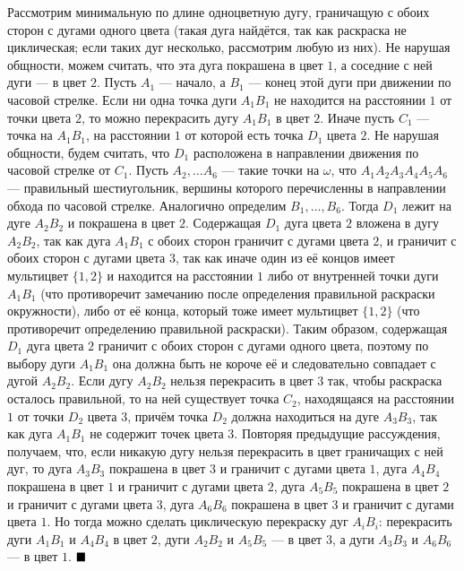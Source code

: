 \documentclass[12pt,a4paper]{article}
\renewcommand{\qed}{$\blacksquare \vspace{5mm}$}
\begin{document}
	Рассмотрим минимальную по длине одноцветную дугу, граничащую с обоих сторон с дугами одного цвета (такая дуга найдётся, так как раскраска не циклическая; если таких дуг несколько, рассмотрим любую из них). Не нарушая общности, можем считать, что эта дуга покрашена в цвет $1$, а соседние с ней дуги --- в цвет $2$. Пусть $A_1$ --- начало, а $B_1$ --- конец этой дуги при движении по часовой стрелке. Если ни одна точка дуги $A_1B_1$ не находится на расстоянии $1$ от точки цвета $2$, то можно перекрасить дугу $A_1B_1$ в цвет $2$. Иначе пусть $C_1$ --- точка на $A_1B_1$, на расстоянии $1$ от которой есть точка $D_1$ цвета $2$. Не нарушая общности, будем считать, что $D_1$ расположена в направлении движения по часовой стрелке от $C_1$. Пусть $A_2, \ldots A_6$ --- такие точки на $\omega$, что $A_1A_2A_3A_4A_5A_6$ --- правильный шестиугольник, вершины которого перечисленны в направлении обхода по часовой стрелке. Аналогично определим $B_1, \ldots, B_6$. Тогда $D_1$ лежит на дуге $A_2B_2$ и покрашена в цвет $2$. Содержащая $D_1$ дуга цвета $2$ вложена в дугу $A_2B_2$, так как дуга $A_1B_1$ с обоих сторон граничит с дугами цвета $2$, и граничит с обоих сторон с дугами цвета $3$, так как иначе один из её концов имеет мультицвет $\{1, 2\}$ и находится на расстоянии $1$ либо от внутренней точки дуги $A_1B_1$ (что противоречит замечанию после определения правильной раскраски окружности), либо от её конца, который тоже имеет мультицвет $\{1, 2\}$ (что противоречит определению правильной раскраски). Таким образом, содержащая $D_1$ дуга цвета $2$ граничит с обоих сторон с дугами одного цвета, поэтому по выбору дуги $A_1B_1$ она должна быть не короче её и следовательно совпадает с дугой $A_2B_2$. Если дугу $A_2B_2$ нельзя перекрасить в цвет $3$ так, чтобы раскраска осталось правильной, то на ней существует точка $C_2$, находящаяся на расстоянии $1$ от точки $D_2$ цвета $3$, причём точка $D_2$ должна находиться на дуге $A_3B_3$, так как дуга $A_1B_1$ не содержит точек цвета $3$. Повторяя предыдущие рассуждения, получаем, что, если никакую дугу нельзя перекрасить в цвет граничащих с ней дуг, то дуга $A_3B_3$ покрашена в цвет $3$ и граничит с дугами цвета $1$, дуга $A_4B_4$ покрашена в цвет $1$ и граничит с дугами цвета $2$, дуга $A_5B_5$ покрашена в цвет $2$ и граничит с дугами цвета $3$, дуга $A_6B_6$ покрашена в цвет $3$ и граничит с дугами цвета $1$. Но тогда можно сделать циклическую перекраску дуг $A_iB_i$: перекрасить дуги $A_1B_1$ и $A_4B_4$ в цвет $2$, дуги $A_2B_2$ и $A_5B_5$ --- в цвет $3$, а дуги $A_3B_3$ и $A_6B_6$ --- в цвет $1$. \qed
\end{document}
